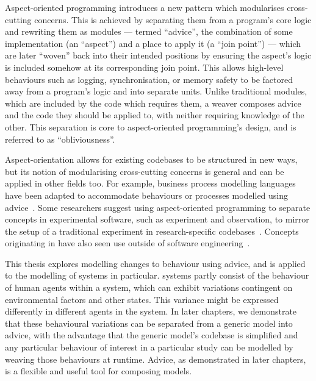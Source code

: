 Aspect-oriented programming introduces a new pattern which modularises
cross-cutting concerns. This is achieved by separating them from a program's
core logic and rewriting them as modules --- termed ``advice'', the combination
of some implementation (an ``aspect'') and a place to apply it (a ``join
point'') --- which are later ``woven'' back into
their intended positions by ensuring the aspect's logic is included somehow at
its corresponding join point. This allows high-level behaviours such as logging,
synchronisation, or memory safety to be factored away from a program's logic and
into separate units. Unlike traditional modules, which are included by the code
which requires them, a weaver composes advice and the code they should be
applied to, with neither requiring knowledge of the other. This separation is
core to aspect-oriented programming's design, and is referred to as
``obliviousness''.

Aspect-orientation allows for existing codebases to be structured in new ways,
but its notion of modularising cross-cutting concerns is general and can be
applied in other fields too. For example, business process modelling languages
have been adapted to accommodate behaviours or processes modelled using
advice~\cite{Cappelli_AOBPM,da2020implementation,charfi2007ao4bpel}. Some
researchers suggest using aspect-oriented programming to separate concepts in
experimental software, such as experiment and observation, to mirror the setup
of a traditional experiment in research-specific codebases~\cite{gulyas1999use}.
Concepts originating in \aop{} have also seen use outside of software
engineering~\cite{Cieslak_2011,Cappelli_AOBPM,da2020implementation,charfi2007ao4bpel}.

This thesis explores modelling changes to behaviour using advice, and is applied
to the modelling of \sociotechnical systems in particular. \Sociotechnical
systems partly consist of the behaviour of human agents within a system, which
can exhibit variations contingent on environmental factors and other states.
This variance might be expressed differently in different agents in the system.
In later chapters, we demonstrate that these behavioural variations can be
separated from a generic model into advice, with the advantage that the generic
model's codebase is simplified and any particular behaviour of interest in a
particular study can be modelled by weaving those behaviours at runtime. Advice,
as demonstrated in later chapters, is a flexible and useful tool for composing
models.


